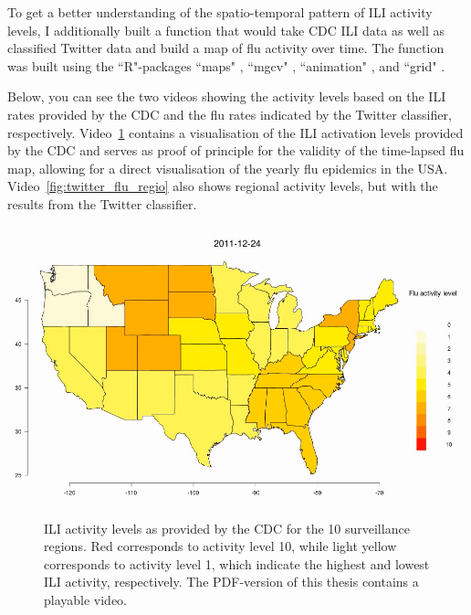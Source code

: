 \documentclass[11pt, a4paper,twoside]{report}\usepackage[]{graphicx}\usepackage[]{color}
\begin{document}
To get a better understanding of the spatio-temporal pattern of ILI activity levels, I additionally built a function that would take CDC ILI data as well as classified Twitter data and build a map of flu activity over time. The function was built using the ``R"-packages ``maps" \citep{maps_2016}, ``mgcv" \citep{mgcv_2006,mgcv_2016}, ``animation" \citep{animation_2015}, and ``grid" \citep{rbase_2017}. 

Below, you can see the two videos showing the activity levels based on the ILI rates provided by the CDC and the flu rates indicated by the Twitter classifier, respectively. Video~\ref{fig:cdc_flu_regio} contains a visualisation of the ILI activation levels provided by the CDC and serves as proof of principle for the validity of the time-lapsed flu map, allowing for a direct visualisation of the yearly flu epidemics in the USA. Video~\ref{fig:twitter_flu_regio} also shows regional activity levels, but with the results from the Twitter classifier. 

\begin{center}
\href{run:vids/1_cdc_flu_regio.avi}{\includegraphics[width=0.9\linewidth]{vids/1_cdc_flu_regio.png}}
\end{center}
\begin{figure}[htbp!]
\centering
  \caption{ILI activity levels as provided by the CDC for the 10 surveillance regions. Red corresponds to activity level 10, while light yellow corresponds to activity level 1, which indicate the highest and lowest ILI activity, respectively. The PDF-version of this thesis contains a playable video.}
    \label{fig:cdc_flu_regio}
\end{figure}
\end{document}
